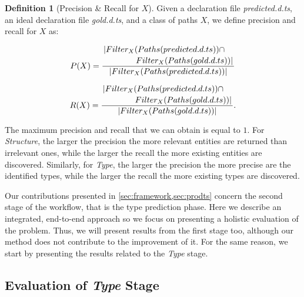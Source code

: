 \documentclass[sigplan,10pt,anonymous]{acmart} %
\theoremstyle{plain}
\theoremstyle{remark}
\theoremstyle{definition}
\newtheorem{defn}{Definition}[section]
\begin{document}
\begin{defn}[Precision \& Recall for $X$] \label{def:precision_recall}
  Given a declaration file \textit{predicted.d.ts}, an ideal declaration file \textit{gold.d.ts}, and a class of paths $X$, we define precision and recall for $X$ as:

  \begin{equation}
    P(X) =
    \dfrac{\splitdfrac{|Filter_X(Paths(predicted.d.ts)) \cap}{Filter_X(Paths(gold.d.ts)) |}}{|Filter_X(Paths(predicted.d.ts)) |}
  \end{equation}
  
  \begin{equation}
    R(X) =
    \dfrac{\splitdfrac{|Filter_X(Paths(predicted.d.ts)) \cap} {Filter_X(Paths(gold.d.ts)) |}}
    {|Filter_X(Paths(gold.d.ts))|}.
  \end{equation}
\end{defn}

The maximum precision and recall that we can obtain is equal to $1$.
For \textit{Structure}, the larger the precision the more relevant entities are returned than irrelevant ones, while the larger the recall the more existing entities are discovered.
Similarly, for \textit{Type}, the larger the precision the more precise are the identified types, while the larger the recall the more existing types are discovered.

Our contributions presented in \cref{sec:framework,sec:prodts} concern the second stage of the workflow, that is the type prediction phase.
Here we describe an integrated, end-to-end approach so we focus on presenting a holistic evaluation of the problem.
Thus, we will present results from the first stage too, although our method does not contribute to the improvement of it.
For the same reason, we start by presenting the results related to the \textit{Type} stage.

\subsection{Evaluation of \textit{Type} Stage}
\end{document}
